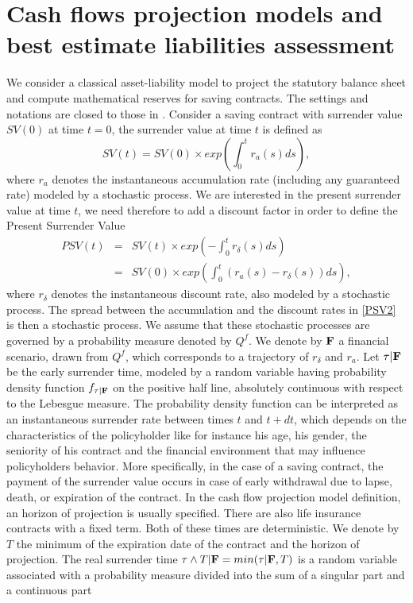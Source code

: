 \section{Cash flows projection models and best estimate liabilities assessment}
We consider a classical asset-liability model to project the statutory balance sheet and compute mathematical reserves for saving contracts. The settings and notations are closed to those in \citet{BoPlJu12}. Consider a saving contract with surrender value $SV(0)$ at time $t=0$, the surrender value at time $t$ is defined as
\begin{equation}\label{SV}
SV(t)=SV(0)\times exp\left(\int^{t}_{0}r_{a}(s)ds\right),
\end{equation}
where $r_{a}$ denotes the instantaneous accumulation rate (including any guaranteed rate) modeled by a stochastic process. We are interested in the present surrender value at time $t$, we need therefore to add a discount factor in order to define the Present Surrender Value
\begin{eqnarray}
PSV(t)&=&SV(t)\times exp\left(-\int^{t}_{0}r_{\delta}(s)ds\right)\nonumber\\
&=&SV(0)\times exp\left(\int^{t}_{0}(r_{a}(s)-r_{\delta}(s))ds\right),\label{PSV2}
\end{eqnarray}
where $r_{\delta}$ denotes the instantaneous discount rate, also modeled by a stochastic process. The spread between the accumulation and the discount rates in \eqref{PSV2} is then a stochastic process. We assume that these stochastic processes are governed by a probability measure denoted by $Q^{f}$. We denote by $\bold{F}$ a financial scenario, drawn from $Q^{f}$, which corresponds to a trajectory of $r_{\delta}$ and $r_{a}$. Let $\tau|\bold{F}$ be the early surrender time, modeled by a random variable having probability density function $f_{\tau|\bold{F}}$ on the positive half line, absolutely continuous with respect to the Lebesgue measure. The probability density function can be interpreted as an instantaneous surrender rate between times $t$ and $t+dt$, which depends on the characteristics of the policyholder like for instance his age, his gender, the seniority of his contract and the financial environment that may influence policyholders behavior. More specifically, in the case of a saving contract, the payment of the surrender value occurs in case of early withdrawal due to lapse, death, or expiration of the contract. In the cash flow projection model definition, an horizon of projection is usually specified. There are also life insurance contracts with a fixed term. Both of these times are deterministic. We denote by $T$ the minimum of the expiration date of the contract and the horizon of projection. The real surrender time $\tau\land T|\bold{F}=min(\tau|\bold{F},T)$ is a random variable associated with a probability measure divided into the sum of a singular part and a continuous part
